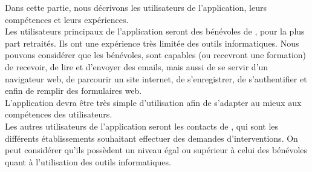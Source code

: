 Dans cette partie, nous décrivons les utilisateurs de l'application, leurs compétences et leurs expériences.\\

Les utilisateurs principaux de l'application seront des bénévoles de \nomClient{}, pour la plus part retraités. Ils ont une expérience très limitée des outils informatiques. Nous pouvons considérer que les bénévoles, sont capables (ou recevront une formation) de recevoir, de lire et d'envoyer des emails, mais aussi de se servir d'un navigateur web, de parcourir un site internet, de s'enregistrer, de s'authentifier et enfin de remplir des formulaires web.\\

L'application devra être très simple d'utilisation afin de s'adapter au mieux aux compétences des utilisateurs.\\

Les autres utilisateurs de l'application seront les contacts de \nomClient{}, qui sont les différents établissements souhaitant effectuer des demandes d'interventions. On peut considérer qu'ils possèdent un niveau égal ou supérieur à celui des bénévoles quant à l'utilisation des outils informatiques.

